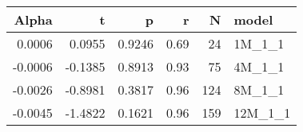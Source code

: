 \begin{table}[ht]
\centering
\begin{tabular}{rrrrrl}
  \hline
Alpha & t & p & r & N & model \\ 
  \hline
0.0006 & 0.0955 & 0.9246 & 0.69 & 24 & 1M\_1\_1 \\ 
  -0.0006 & -0.1385 & 0.8913 & 0.93 & 75 & 4M\_1\_1 \\ 
  -0.0026 & -0.8981 & 0.3817 & 0.96 & 124 & 8M\_1\_1 \\ 
  -0.0045 & -1.4822 & 0.1621 & 0.96 & 159 & 12M\_1\_1 \\ 
   \hline
\end{tabular}
\end{table}

